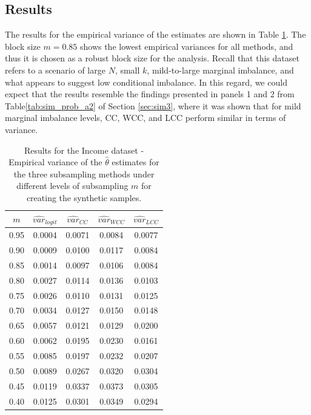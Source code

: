 \subsection{Results}

The results for the empirical variance of the estimates are shown in Table \ref{tab:data-res}. The block size $m=0.85$ shows the lowest empirical variances for all methods, and thus it is chosen as a robust block size for the analysis. 
Recall that this dataset refers to a scenario of large $N$, small $k$, mild-to-large marginal imbalance, and what appears to suggest low conditional imbalance. In this regard, we could expect that the results resemble the findings presented in panels 1 and 2 from Table\ref{tab:sim_prob_a2} of Section \ref{sec:sim3}, where it was shown that for mild marginal imbalance levels, CC, WCC, and LCC
perform similar in terms of variance.


\begin{table}[ht]
\centering
\begin{tabular}{ccccc}
  \hline
$m$ & $\widehat{var}_{logit}$ & $\widehat{var}_{CC}$ & $\widehat{var}_{WCC}$ & $\widehat{var}_{LCC}$ \\ 
  \hline
0.95 & 0.0004 & 0.0071 & 0.0084 & 0.0077 \\ 
  0.90 & 0.0009 & 0.0100 & 0.0117 & 0.0084 \\ 
  0.85 & 0.0014 & 0.0097 & 0.0106 & 0.0084 \\ 
  0.80 & 0.0027 & 0.0114 & 0.0136 & 0.0103 \\ 
  0.75 & 0.0026 & 0.0110 & 0.0131 & 0.0125 \\ 
  0.70 & 0.0034 & 0.0127 & 0.0150 & 0.0148 \\ 
  0.65 & 0.0057 & 0.0121 & 0.0129 & 0.0200 \\ 
  0.60 & 0.0062 & 0.0195 & 0.0230 & 0.0161 \\ 
  0.55 & 0.0085 & 0.0197 & 0.0232 & 0.0207 \\ 
  0.50 & 0.0089 & 0.0267 & 0.0320 & 0.0304 \\ 
  0.45 & 0.0119 & 0.0337 & 0.0373 & 0.0305 \\ 
  0.40 & 0.0125 & 0.0301 & 0.0349 & 0.0294 \\ 
   \hline
\end{tabular}
\caption[Data application - Empirical variance results for the Income dataset]{Results for the Income dataset - Empirical variance of the $\hat{\theta}$ estimates for the three subsampling methods under different levels of subsampling $m$ for creating the synthetic samples.}
\label{tab:data-res}
\end{table}


